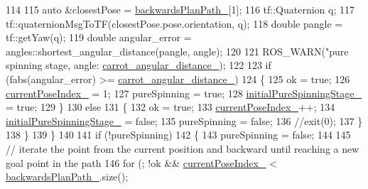 \begin{DoxyCode}
114 
115             \textcolor{keyword}{auto} &closestPose = \hyperlink{classmove__base__z__client_1_1backward__local__planner_1_1BackwardLocalPlanner_a451add2af7d6d83a7415277311b3ed04}{backwardsPlanPath\_}[1];
116             tf::Quaternion q;
117             tf::quaternionMsgToTF(closestPose.pose.orientation, q);
118             \textcolor{keywordtype}{double} pangle = tf::getYaw(q);
119             \textcolor{keywordtype}{double} angular\_error = angles::shortest\_angular\_distance(pangle, angle);
120 
121             ROS\_WARN(\textcolor{stringliteral}{"pure spinning stage, angle: %
      \hyperlink{classmove__base__z__client_1_1backward__local__planner_1_1BackwardLocalPlanner_a3d6cba0748b85a67f5dfd7740de9530f}{carrot\_angular\_distance\_});
122 
123             \textcolor{keywordflow}{if} (fabs(angular\_error) >= \hyperlink{classmove__base__z__client_1_1backward__local__planner_1_1BackwardLocalPlanner_a3d6cba0748b85a67f5dfd7740de9530f}{carrot\_angular\_distance\_})
124             \{
125                 ok = \textcolor{keyword}{true};
126                 \hyperlink{classmove__base__z__client_1_1backward__local__planner_1_1BackwardLocalPlanner_af304b2e7cde744ad905a1ae7889102b6}{currentPoseIndex\_} = 1;
127                 pureSpinning = \textcolor{keyword}{true};
128                 \hyperlink{classmove__base__z__client_1_1backward__local__planner_1_1BackwardLocalPlanner_a5db5b10d8cdf425321ee6ec932f594ae}{initialPureSpinningStage\_} = \textcolor{keyword}{true};
129             \}
130             \textcolor{keywordflow}{else}
131             \{
132                 ok = \textcolor{keyword}{true};
133                 \hyperlink{classmove__base__z__client_1_1backward__local__planner_1_1BackwardLocalPlanner_af304b2e7cde744ad905a1ae7889102b6}{currentPoseIndex\_}++;
134                 \hyperlink{classmove__base__z__client_1_1backward__local__planner_1_1BackwardLocalPlanner_a5db5b10d8cdf425321ee6ec932f594ae}{initialPureSpinningStage\_} = \textcolor{keyword}{false};
135                 pureSpinning = \textcolor{keyword}{false};
136                 \textcolor{comment}{//exit(0);}
137             \}
138         \}
139     \}
140 
141     \textcolor{keywordflow}{if} (!pureSpinning)
142     \{
143         pureSpinning = \textcolor{keyword}{false};
144 
145         \textcolor{comment}{// iterate the point from the current position and backward until reaching a new goal point in the
       path}
146         \textcolor{keywordflow}{for} (; !ok && \hyperlink{classmove__base__z__client_1_1backward__local__planner_1_1BackwardLocalPlanner_af304b2e7cde744ad905a1ae7889102b6}{currentPoseIndex\_} < \hyperlink{classmove__base__z__client_1_1backward__local__planner_1_1BackwardLocalPlanner_a451add2af7d6d83a7415277311b3ed04}{backwardsPlanPath\_}.size(); 
}
\end{DoxyCode}
